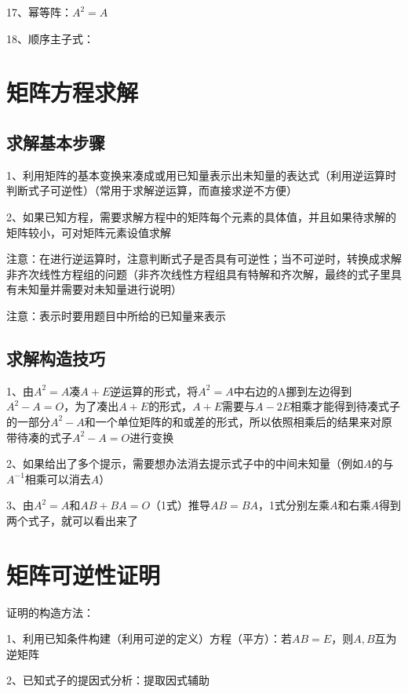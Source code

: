 17、幂等阵：$A^2=A$

18、顺序主子式：

\section{矩阵方程求解}



\subsection{求解基本步骤}

1、利用矩阵的基本变换来凑成或用已知量表示出未知量的表达式（利用逆运算时判断式子可逆性）（常用于求解逆运算，而直接求逆不方便）

2、如果已知方程，需要求解方程中的矩阵每个元素的具体值，并且如果待求解的矩阵较小，可对矩阵元素设值求解

注意：在进行逆运算时，注意判断式子是否具有可逆性；当不可逆时，转换成求解非齐次线性方程组的问题（非齐次线性方程组具有特解和齐次解，最终的式子里具有未知量并需要对未知量进行说明）

注意：表示时要用题目中所给的已知量来表示



\subsection{求解构造技巧}

1、由$A^2=A$凑$A+E$逆运算的形式，将$A^2=A$中右边的A挪到左边得到$A^2-A=O$，为了凑出$A+E$的形式，$A+E$需要与$A-2E$相乘才能得到待凑式子的一部分$A^2-A$和一个单位矩阵的和或差的形式，所以依照相乘后的结果来对原带待凑的式子$A^2-A=O$进行变换

2、如果给出了多个提示，需要想办法消去提示式子中的中间未知量（例如$A$的与$A^{-1}$相乘可以消去$A$）

3、由$A^2=A$和$AB+BA=O$（1式）推导$AB=BA$，1式分别左乘$A$和右乘$A$得到两个式子，就可以看出来了

\section{矩阵可逆性证明}

证明的构造方法：

1、利用已知条件构建（利用可逆的定义）方程（平方）：若$AB=E$，则$A,B$互为逆矩阵

2、已知式子的提因式分析：提取因式辅助

